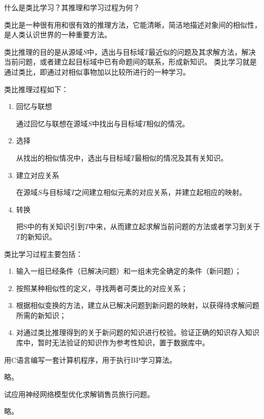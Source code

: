 \begin{question}
什么是类比学习？其推理和学习过程为何？
\end{question}
\begin{solution}
类比是一种很有用和很有效的推理方法，它能清晰，简洁地描述对象间的相似性，是人类认识世界的一种重要方法。\par
类比推理的目的是从源域$S$中，选出与目标域$T$最近似的问题及其求解方法，解决当前问题，或者建立起目标域中已有命题间的联系，形成新知识。 
类比学习就是通过类比，即通过对相似事物加以比较所进行的一种学习。\par
类比推理过程如下：
	\begin{enumerate}
		\item 回忆与联想 \par
		通过回忆与联想在源域$S$中找出与目标域$T$相似的情况。 
		\item 选择 \par
		从找出的相似情况中，选出与目标域$T$最相似的情况及其有关知识。 
		\item 建立对应关系 \par
		在源域$S$与目标域$T$之间建立相似元素的对应关系，并建立起相应的映射。 
		\item 转换 \par
		把S中的有关知识引到$T$中来，从而建立起求解当前问题的方法或者学习到关于$T$的新知识。 
	\end{enumerate} \par
类比学习过程主要包括： 
	\begin{enumerate}
		\item 输入一组已经条件（已解决问题）和一组未完全确定的条件（新问题）；
		\item 按照某种相似性的定义，寻找两者可类比的对应关系；
		\item 根据相似变换的方法，建立从已解决问题到新问题的映射，以获得待求解问题所需的新知识；
		\item 对通过类比推理得到的关于新问题的知识进行校验。验证正确的知识存入知识库中，暂时无法验证的知识作为参考性知识，置于数据库中。
	\end{enumerate}
\end{solution}

\begin{question}
用C语言编写一套计算机程序，用于执行BP学习算法。
\end{question}
\begin{solution}
略。
\end{solution}

\begin{question}
试应用神经网络模型优化求解销售员旅行问题。
\end{question}
\begin{solution}
略。
\end{solution}

